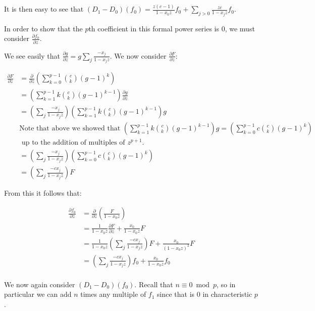 \documentclass{article}
\numberwithin{equation}{section}
\begin{document}
It is then easy to see that $(D_1-D_0)(f_0)=\frac{z(c-1)}{1-x_0z}f_0+\sum_{j>0} \frac{zc}{1-x_jz}f_0$. 

In order to show that the $p$th coefficient in this formal power series is $0$, we must consider $\frac{\partial f_0}{\partial z}$. 

We see easily that $\frac{\partial g}{\partial z} = g \sum_j \frac{-x_j}{1-x_jz}$. We now consider $\frac{\partial F}{\partial z}$:

\begin{align*}
\frac{\partial F}{\partial z}&=\frac{\partial}{\partial z}\left(\sum_{k=0}^{p-1} \binom{c}{k} (g-1)^k\right)\\
&=\left(\sum_{k=1}^{p-1}k\binom{c}{k}(g-1)^{k-1}\right)\frac{\partial g}{\partial z}\\
&=\left(\sum_j \frac{-x_j}{1-x_jz}\right)\left(\sum_{k=1}^{p-1}k\binom{c}{k}(g-1)^{k-1}\right)g\\
&\text{Note that above we showed that }\left(\sum_{k=1}^{p-1}k\binom{c}{k}(g-1)^{k-1}\right)g=\left(\sum_{k=0}^{p-1}c\binom{c}{k}(g-1)^{k}\right)\\&\text{ up to the addition of multiples of }z^{p+1}.\\
&=\left(\sum_j \frac{-x_j}{1-x_jz}\right)\left(\sum_{k=0}^{p-1}c\binom{c}{k}(g-1)^{k}\right)\\
&=\left(\sum_j \frac{-cx_j}{1-x_jz}\right)F
\end{align*}

From this it follows that:

\begin{align*}
\frac{\partial f_0}{\partial z} &= \frac{\partial}{\partial z}\left(\frac{F}{1-x_0z}\right)\\
&=\frac{1}{1-x_0z} \frac{\partial F}{\partial z}+\frac{x_0}{1-x_0z} F\\
&=\frac{1}{1-x_0z}\left(\sum_j \frac{-cx_j}{1-x_jz}\right)F+\frac{x_0}{(1-x_0z)^2} F\\
&=\left(\sum_j \frac{-cx_j}{1-x_jz}\right)f_0+\frac{x_0}{1-x_0z} f_0\\
\end{align*}

We now again consider $(D_1-D_0)(f_0)$. Recall that $n \equiv 0 \bmod p$, so in particular we can add $n$ times any multiple of $f_1$ since that is $0$ in characteristic $p$. 
\end{document}
